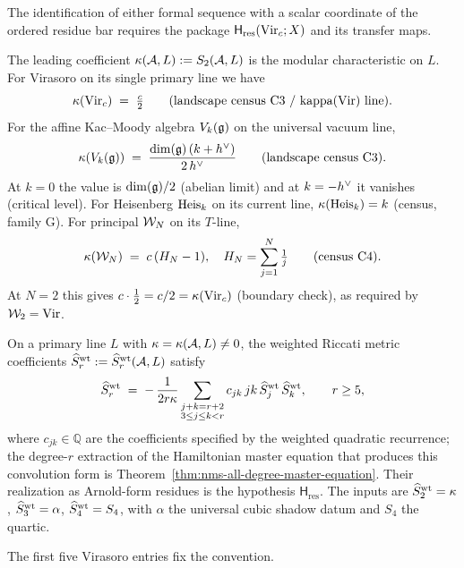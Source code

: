 \begin{remark}
The identification of either formal sequence with a scalar coordinate
of the ordered residue bar requires the package
$\mathsf H_{\mathrm{res}}(\mathrm{Vir}_c;X)$ and its transfer maps.
\end{remark}

\begin{remark}[Curvature]
\label{rem:curvature-kappa-normalization}
The leading coefficient $\kappa(\mathcal{A}, L) := S_2(\mathcal{A}, L)$ is the
modular characteristic on $L$. For Virasoro on its single primary
line we have
\[
\kappa(\mathrm{Vir}_c) \;=\; \tfrac{c}{2}
\qquad \text{(landscape census C3 / kappa(Vir) line).}
\]
For the affine Kac--Moody algebra $V_k(\mathfrak{g})$ on the universal vacuum
line,
\[
\kappa(V_k(\mathfrak{g})) \;=\; \frac{\dim(\mathfrak{g})\,(k + h^{\vee})}{2\,h^{\vee}}
\qquad \text{(landscape census C3).}
\]
At $k=0$ the value is $\dim(\mathfrak{g})/2$ (abelian limit) and at
$k=-h^{\vee}$ it vanishes (critical level). For Heisenberg
$\mathrm{Heis}_k$ on its current line, $\kappa(\mathrm{Heis}_k) = k$
(census, family G). For principal $\mathcal{W}_N$ on its $T$-line,
\[
\kappa(\mathcal{W}_N) \;=\; c\,(H_N - 1),
\quad H_N = \sum_{j=1}^{N} \tfrac{1}{j}
\qquad \text{(census C4).}
\]
At $N=2$ this gives $c\cdot \tfrac{1}{2} = c/2 = \kappa(\mathrm{Vir}_c)$
(boundary check), as required by $\mathcal{W}_2 = \mathrm{Vir}$.
\end{remark}

\begin{lemma}
\label{lem:mc-recursion-line}
\ClaimStatusConditional
On a primary line $L$ with $\kappa = \kappa(\mathcal{A}, L) \neq 0$, the
weighted Riccati metric coefficients
$\widehat S^{\rm wt}_r := \widehat S^{\rm wt}_r(\mathcal{A}, L)$ satisfy
\[
\widehat S^{\rm wt}_r \;=\; -\,\frac{1}{2 r \kappa}
\sum_{\substack{j+k = r+2 \\ 3 \le j \le k < r}} c_{jk}\,j k \,
\widehat S^{\rm wt}_j\,\widehat S^{\rm wt}_k,
\qquad r \ge 5,
\]
where $c_{jk} \in \mathbb Q$ are the coefficients specified by the
weighted quadratic recurrence; the degree-$r$ extraction of the
Hamiltonian master equation that produces this convolution form is
Theorem~\ref{thm:nms-all-degree-master-equation}.  Their realization
as Arnold-form residues is the hypothesis
$\mathsf H_{\mathrm{res}}$. The
inputs are $\widehat S^{\rm wt}_2 = \kappa$,
$\widehat S^{\rm wt}_3 = \alpha$, $\widehat S^{\rm wt}_4=S_4$, with $\alpha$ the
universal cubic shadow datum and $S_4$ the quartic.
\end{lemma}

The first five Virasoro entries fix the convention.

